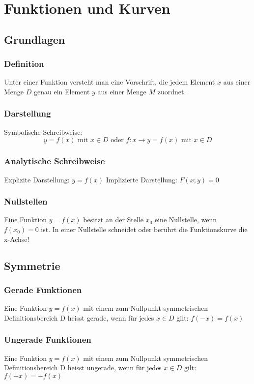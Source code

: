 \chapter{Funktionen und Kurven}
\section{Grundlagen}
\subsection{Definition}
Unter einer Funktion versteht man eine Vorschrift, die jedem Element \(x\) aus einer Menge \(D\) genau ein Element \(y\) aus einer Menge \(M\) zuordnet.

\subsection{Darstellung}
Symbolische Schreibweise:
$$y = f(x) \text{ mit } x \in D \text{ oder } f: x \rightarrow y = f(x) \text{ mit } x \in D$$

\subsection{Analytische Schreibweise}
Explizite Darstellung: \(y = f (x) \)
\newline Implizierte Darstellung: \(F(x;y) = 0\)

\subsection{Nullstellen} %
\label{sec:nullstellen}
Eine Funktion \(y = f(x)\) besitzt an der Stelle \(x_{0}\) eine Nullstelle, wenn \(f(x_{0}) = 0\) ist. In einer Nullstelle schneidet oder berührt die Funktionskurve die x-Achse!

\section{Symmetrie} %
\subsection{Gerade Funktionen} %
Eine Funktion \(y = f(x)\) mit einem zum Nullpunkt symmetrischen Definitionsbereich D heisst gerade, wenn für jedes \(x \in D\) gilt:
\newline \(f(-x) = f(x)\)

\subsection{Ungerade Funktionen}
Eine Funktion \(y = f(x)\) mit einem zum Nullpunkt symmetrischen Definitionsbereich D heisst ungerade, wenn für jedes \(x \in D\) gilt:
\newline \(f(-x) = -f(x)\)

